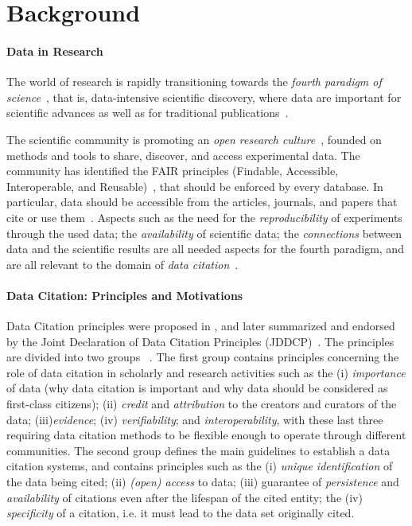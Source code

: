 \section{Background}
\label{sec:related}

\paragraph{Data in Research} %
The world of research is rapidly transitioning towards the \emph{fourth paradigm of science}~\citep{hey2009jim}, that is, data-intensive scientific discovery, where data are important for scientific advances as well as for traditional publications~\citep{Bechhofer2013linkisnotenough}.

The scientific community is promoting an \emph{open research culture}~\citep{nosek2015promoting}, founded on methods and tools to share, discover, and access experimental data. 
The community has identified the FAIR principles (Findable, Accessible, Interoperable, and Reusable)~\citep{fair2016Wilikinson}, that should be enforced by every database. 
In particular, data should be accessible from the articles, journals, and papers that cite or use them~\citep{cousijn2019bringing}.
Aspects such as the need for the \emph{reproducibility} of experiments through the used data; the \emph{availability} of scientific data; the \emph{connections} between data and the scientific results are all needed aspects for the fourth paradigm, and are all relevant to the domain of \emph{data citation}~\citep{honor2016data}.

\paragraph{Data Citation: Principles and Motivations} Data Citation principles were proposed in \citep{CODATA2013}, and later summarized and endorsed by the Joint Declaration of Data Citation Principles (JDDCP)~\citep{martone2014joint}. 
The principles are divided into two groups~ \citep{Silvello18jasist}. The first group contains principles concerning the role of data citation in scholarly and research activities such as the (i) \emph{importance} of data (why data citation is important and why data should be considered as first-class citizens); (ii) \emph{credit} and \emph{attribution} to the creators and curators of the data; (iii)\emph{evidence}; (iv) \emph{verifiability}; and \emph{interoperability}, with these last three requiring data citation methods to be flexible enough to operate through different communities. 
The second group defines the main guidelines to establish a data citation systems, and contains principles such as the (i) \emph{unique identification} of the data being cited; (ii) \emph{(open) access} to data; (iii) guarantee of \emph{persistence} and \emph{availability} of citations even after the lifespan of the cited entity; the (iv) \emph{specificity} of a citation, i.e. it must lead to the data set originally cited.

